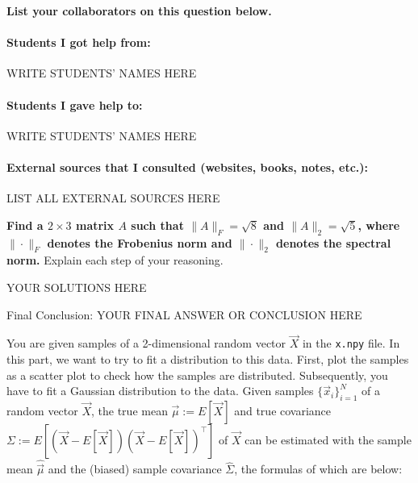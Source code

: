 
\textbf{List your collaborators on this question below. }

\begin{solution}

\paragraph{Students I got help from:} WRITE STUDENTS' NAMES HERE

\paragraph{Students I gave help to:} WRITE STUDENTS' NAMES HERE

\paragraph{External sources that I consulted (websites, books, notes, etc.):} LIST ALL EXTERNAL SOURCES HERE

\end{solution}

\qpart{[5 points]}
\textbf{Find a $2 \times 3$ matrix $A$ such that $\|A\|_F = \sqrt{8}$ and $\|A\|_2 = \sqrt{5}$, where $\|\cdot\|_F$ denotes the Frobenius norm and $\|\cdot\|_2$ denotes the spectral norm.} Explain each step of your reasoning. 

\begin{solution}

YOUR SOLUTIONS HERE

{\color{red} Final Conclusion: YOUR FINAL ANSWER OR CONCLUSION HERE}

\end{solution}

\qpart{[5 points]}

 You are given samples of a 2-dimensional random vector $\vec{X}$ in the \texttt{x.npy} file. In this part, we want to try to fit a distribution to this data. First, plot the samples as a scatter plot to check how the samples are distributed. Subsequently, you have to fit a Gaussian distribution to the data. Given samples $\{\vec{x}_i\}_{i=1}^{N}$ of a random vector $\vec{X}$, the true mean $\vec{\mu} := E[\vec{X}]$ and true covariance $\Sigma := E[(\vec{X} - E[\vec{X}])(\vec{X} - E[\vec{X}])^\top]$ of $\vec{X}$ can be estimated with the sample mean $\widehat{\vec{\mu}}$ and the (biased) sample covariance $\widehat{\Sigma}$, the formulas of which are below:

